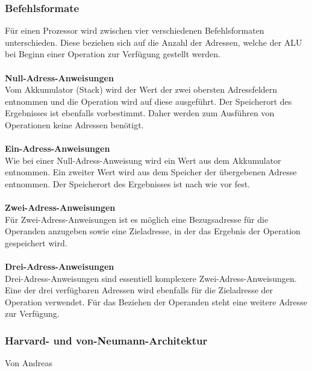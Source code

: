 \documentclass[12pt]{article}
\begin{document}
\subsubsection{Befehlsformate}
Für einen Prozessor wird zwischen vier verschiedenen Befehlsformaten unterschieden. Diese beziehen sich auf die Anzahl der Adressen, welche der ALU bei Beginn einer Operation zur Verfügung gestellt werden. \cite{Adressformate}\\ \\
\textbf{Null-Adress-Anweisungen}\\
Vom Akkumulator (Stack) wird der Wert der zwei obersten Adressfeldern entnommen und die Operation wird auf diese ausgeführt. Der Speicherort des Ergebnisses ist ebenfalls vorbestimmt. Daher werden zum Ausführen von Operationen keine Adressen benötigt.\\ \\
\textbf{Ein-Adress-Anweisungen}\\
Wie bei einer Null-Adress-Anweisung wird ein Wert aus dem Akkumulator entnommen. Ein zweiter Wert wird aus dem Speicher der übergebenen Adresse entnommen. Der Speicherort des Ergebnisses ist nach wie vor fest.\\ \\
\textbf{Zwei-Adress-Anweisungen}\\
Für Zwei-Adress-Anweisungen ist es möglich eine Bezugsadresse für die Operanden anzugeben sowie eine Zieladresse, in der das Ergebnis der Operation gespeichert wird.\\ \\
\textbf{Drei-Adress-Anweisungen}\\
Drei-Adress-Anweisungen sind essentiell komplexere Zwei-Adress-Anweisungen. Eine der drei verfügbaren Adressen wird ebenfalls für die Zieladresse der Operation verwendet. Für das Beziehen der Operanden steht eine weitere Adresse zur Verfügung.\\

\subsubsection{Harvard- und von-Neumann-Architektur}
Von Andreas\\
\end{document}
